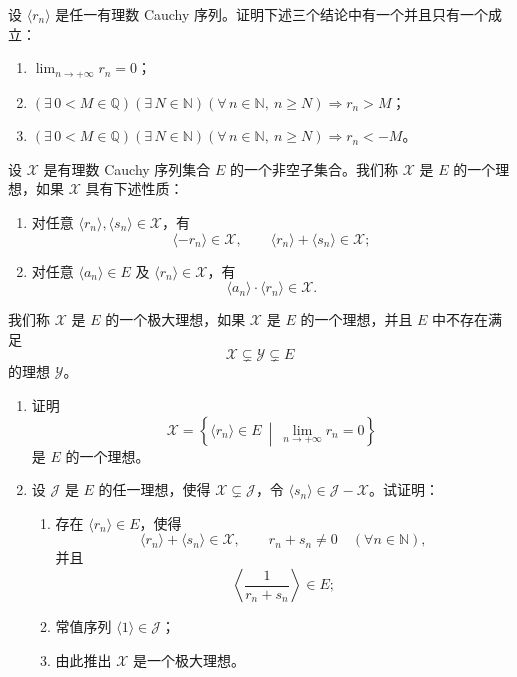 \begin{exercise}
  \item 设 \(\langle r_n\rangle\) 是任一有理数 Cauchy 序列。证明下述三个结论中有一个并且只有一个成立：
  \begin{enumerate}[label=\arabic*)]
    \item \(\displaystyle\lim_{n\to+\infty}r_n=0\)；
    \item \((\exists\,0<M\in\mathbb{Q})(\exists\,N\in\mathbb{N})
    (\forall\,n\in\mathbb{N},\ n\geq N)\Longrightarrow r_n>M\)；
    \item \((\exists\,0<M\in\mathbb{Q})(\exists\,N\in\mathbb{N})
    (\forall\,n\in\mathbb{N},\ n\geq N)\Longrightarrow r_n<-M\)。
  \end{enumerate}
\end{exercise}

\begin{exercise}
  \item 设 \(\mathscr{X}\) 是有理数 Cauchy 序列集合 \(E\) 的一个非空子集合。我们称 \(\mathscr{X}\) 是 \(E\) 的一个理想，如果 \(\mathscr{X}\) 具有下述性质：
  \begin{enumerate}[label=\arabic*)]
    \item 对任意 \(\langle r_n\rangle,\langle s_n\rangle\in\mathscr{X}\)，有
    \[
    \langle-r_n\rangle\in\mathscr{X},\qquad
    \langle r_n\rangle+\langle s_n\rangle\in\mathscr{X};
    \]
    \item 对任意 \(\langle a_n\rangle\in E\) 及
    \(\langle r_n\rangle\in\mathscr{X}\)，有
    \[
    \langle a_n\rangle\cdot\langle r_n\rangle\in\mathscr{X}.
    \]
  \end{enumerate}
  我们称 \(\mathscr{X}\) 是 \(E\) 的一个极大理想，如果 \(\mathscr{X}\) 是 \(E\) 的一个理想，并且 \(E\) 中不存在满足
  \[
  \mathscr{X}\subsetneq\mathscr{Y}\subsetneq E
  \]
  的理想 \(\mathscr{Y}\)。
  \begin{enumerate}[label=\arabic*)]
    \item 证明
    \[
    \mathscr{X}
    =\left\{\langle r_n\rangle\in E\ \middle|\
    \lim_{n\to+\infty}r_n=0\right\}
    \]
    是 \(E\) 的一个理想。
    \item 设 \(\mathscr{J}\) 是 \(E\) 的任一理想，使得
    \(\mathscr{X}\subsetneq\mathscr{J}\)，令
    \(\langle s_n\rangle\in\mathscr{J}-\mathscr{X}\)。试证明：
    \begin{enumerate}[label=\alph*)]
      \item 存在 \(\langle r_n\rangle\in E\)，使得
      \[
      \langle r_n\rangle+\langle s_n\rangle\in\mathscr{X},\qquad
      r_n+s_n\neq0\quad(\forall n\in\mathbb{N}),
      \]
      并且
      \[
      \left\langle\frac{1}{r_n+s_n}\right\rangle\in E;
      \]
      \item 常值序列 \(\langle1\rangle\in\mathscr{J}\)；
      \item 由此推出 \(\mathscr{X}\) 是一个极大理想。
    \end{enumerate}
  \end{enumerate}
\end{exercise}

